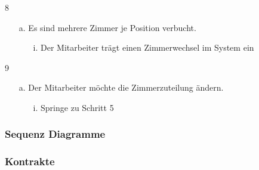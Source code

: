 \documentclass[./detailed_overview_usecases.tex]{subfiles}
\begin{document}
    \item 8 \begin{itemize}
                \item[a.] Es sind mehrere Zimmer je Position verbucht.
                \begin{itemize}
                    \item[i.] Der Mitarbeiter trägt einen Zimmerwechsel im System ein
                \end{itemize}
    \end{itemize}
    \item 9 \begin{itemize}
                \item[a.] Der Mitarbeiter möchte die Zimmerzuteilung ändern.
                \begin{itemize}
                    \item[i.] Springe zu Schritt 5
                \end{itemize}
    \end{itemize}
    \subsubsection{Sequenz Diagramme}
    \subsubsection{Kontrakte}
\end{document}
